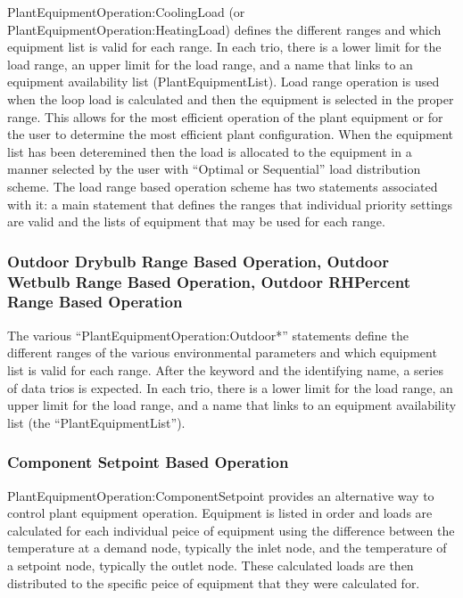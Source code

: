 PlantEquipmentOperation:CoolingLoad (or PlantEquipmentOperation:HeatingLoad) defines the different ranges and which equipment list is valid for each range. In each trio, there is a lower limit for the load range, an upper limit for the load range, and a name that links to an equipment availability list (PlantEquipmentList). Load range operation is used when the loop load is calculated and then the equipment is selected in the proper range. This allows for the most efficient operation of the plant equipment or for the user to determine the most efficient plant configuration. When the equipment list has been deteremined then the load is allocated to the equipment in a manner selected by the user with ``Optimal or Sequential'' load distribution scheme. The load range based operation scheme has two statements associated with it: a main statement that defines the ranges that individual priority settings are valid and the lists of equipment that may be used for each range.

\subsubsection{Outdoor Drybulb Range Based Operation, Outdoor Wetbulb Range Based Operation, Outdoor RHPercent Range Based Operation}\label{outdoor-drybulb-range-based-operation-outdoor-wetbulb-range-based-operation-outdoor-rhpercent-range-based-operation}

The various ``PlantEquipmentOperation:Outdoor*'' statements define the different ranges of the various environmental parameters and which equipment list is valid for each range. After the keyword and the identifying name, a series of data trios is expected. In each trio, there is a lower limit for the load range, an upper limit for the load range, and a name that links to an equipment availability list (the ``PlantEquipmentList'').

\subsubsection{Component Setpoint Based Operation}\label{component-setpoint-based-operation}

PlantEquipmentOperation:ComponentSetpoint provides an alternative way to control plant equipment operation.  Equipment is listed in order and loads are calculated for each individual peice of equipment using the difference between the temperature at a demand node, typically the inlet node, and the temperature of a setpoint node, typically the outlet node. These calculated loads are then distributed to the specific peice of equipment that they were calculated for. 

